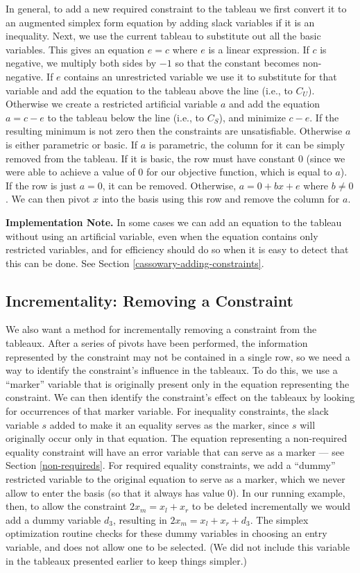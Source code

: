 \documentclass{article}
\begin{document}
In general, to add a new required constraint to the tableau we first
convert it to an augmented simplex form equation by adding slack variables
if it is an inequality.  Next, we use the current tableau to substitute out
all the basic variables.  This gives an equation $e = c$ where $e$ is a
linear expression.  If $c$ is negative, we multiply both sides by $-1$ so
that the constant becomes non-negative.  If $e$ contains an unrestricted
variable we use it to substitute for that variable and add the equation to
the tableau above the line (i.e., to $C_U$).  Otherwise we create a
restricted artificial variable $a$ and add the equation $a = c - e$ to the
tableau below the line (i.e., to $C_S$), and minimize $c - e$. If the
resulting minimum is not zero then the constraints are unsatisfiable.
Otherwise $a$ is either parametric or basic.  If $a$ is parametric, the
column for it can be simply removed from the tableau.  If it is basic, the
row must have constant 0 (since we were able to achieve a value of 0 for
our objective function, which is equal to $a$).  If the row is just $a =
0$, it can be removed.  Otherwise, $a = 0 + b x + e$ where $b \neq 0$.  We
can then pivot $x$ into the basis using this row and remove the column for
$a$.

{\bf Implementation Note.}  In some cases we can add an equation to the
tableau without using an artificial variable, even when the equation
contains only restricted variables, and for efficiency should do so when
it is easy to detect that this can be done.  See Section
\ref{cassowary-adding-constraints}.

\subsection{Incrementality: Removing a Constraint}
\label{removing-constraints}

We also want a method for incrementally removing a constraint from the
tableaux.  After a series of pivots have been performed, the information
represented by the constraint may not be contained in a single row, so we
need a way to identify the constraint's influence in the tableaux.  To do
this, we use a ``marker'' variable that is originally present only in the
equation representing the constraint.  We can then identify the
constraint's effect on the tableaux by looking for occurrences of that
marker variable.  For inequality constraints, the slack variable $s$ added
to make it an equality serves as the marker, since $s$ will originally
occur only in that equation.  The equation representing a non-required
equality constraint will have an error variable that can serve as a marker
--- see Section \ref{non-requireds}.  For required equality constraints, we
add a ``dummy'' restricted variable to the original equation to serve as a
marker, which we never allow to enter the basis (so that it always has
value 0).  In our running example, then, to allow the constraint $2 x_m =
x_l + x_r$ to be deleted incrementally we would add a dummy variable $d_3$,
resulting in $2 x_m = x_l + x_r + d_3$.  The simplex optimization routine
checks for these dummy variables in choosing an entry variable, and does
not allow one to be selected.  (We did not include this variable in the
tableaux presented earlier to keep things simpler.)
\end{document}

